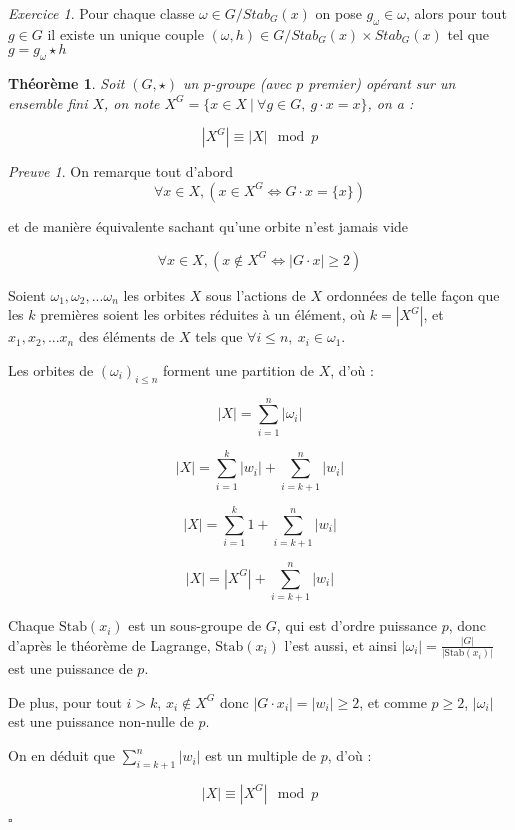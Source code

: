 \documentclass[]{article}
\newtheorem{mythm}{Théorème}
\theoremstyle{remark}
\newtheorem{myexer}{Exercice}
\newtheorem{myproof}{Preuve}
\theoremstyle{definition}
\newcommand{\cqfd}{
	\hfill$\square$
}
\begin{document}
\begin{myexer}
	Pour chaque classe $\omega \in G/Stab_G(x)$ on pose $g_\omega \in \omega$, alors pour tout $g \in G$ il existe un unique couple $(\omega, h) \in G/Stab_G(x) \times Stab_G(x)$ tel que $g = g_\omega \star h$
\end{myexer}

\begin{mythm}
	Soit $(G, \star)$ un $p$-groupe (avec $p$ premier) opérant sur un ensemble fini $X$, on note
	$X^G = \{x \in X ~ | ~ \forall g \in G, ~ g \cdot x = x\}$, on a :
	
	$$|X^G| \equiv |X| \mod p$$
\end{mythm}

\begin{myproof}
	On remarque tout d'abord
	$$\forall x \in X, (x \in X^G \Longleftrightarrow G \cdot x = \{x\})$$
	
	et de manière équivalente sachant qu'une orbite n'est jamais vide
	
	$$\forall x \in X, (x \notin X^G \Longleftrightarrow |G \cdot x| \geqslant 2)$$
	
	Soient $\omega_1, \omega_2, ...\omega_n$ les orbites $X$ sous l'actions de $X$ ordonnées de telle façon que les $k$ premières soient les orbites réduites à un élément, où $k = \left|X^G\right|$, et $x_1, x_2, ...x_n$ des éléments de $X$ tels que $\forall i \leqslant n, ~ x_i \in \omega_1$.
	
	Les orbites de $(\omega_i)_{i \leqslant n}$ forment une partition de $X$, d'où :
	
	$$|X| = \sum_{i = 1}^{n} |\omega_i|$$
	
	$$|X| = \sum_{i = 1}^{k} |w_i| + \sum_{i = k + 1}^{n} |w_i|$$
	
	$$|X| = \sum_{i = 1}^{k} 1 + \sum_{i = k + 1}^{n} |w_i|$$
	
	$$|X| = \left|X^G\right| + \sum_{i = k + 1}^{n} |w_i|$$
	
	Chaque $\text{Stab}(x_i)$ est un sous-groupe de $G$, qui est d'ordre puissance $p$, donc d'après le théorème de Lagrange, $\text{Stab}(x_i)$ l'est aussi, et ainsi $\displaystyle |\omega_i| = \frac{|G|}{|\text{Stab}(x_i)|}$ est une puissance de $p$.
	
	De plus, pour tout $i > k$, $x_i \notin X^G$ donc $|G \cdot x_i| = |w_i| \geqslant 2$, et comme $p \geqslant 2$, $|\omega_i|$ est une puissance non-nulle de $p$.
	
	On en déduit que $\displaystyle \sum_{i = k + 1}^{n} |w_i|$ est un multiple de $p$, d'où :
	
	$$|X| \equiv \left|X^G\right| \mod p$$
	
	\cqfd
\end{myproof}
\end{document}
